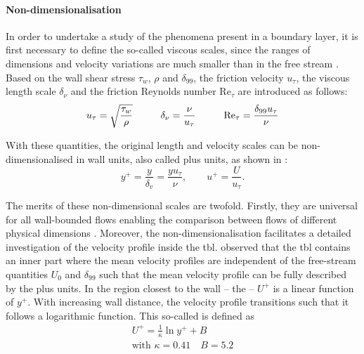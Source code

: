 \paragraph{Non-dimensionalisation}

In order to undertake a study of the phenomena present in a boundary layer, it is first necessary to define the so-called viscous scales, since the ranges of dimensions and velocity variations are much smaller than in the free stream \citep{pope_turbulent_2015}.
%
Based on the wall shear stress $\tau_w$, $\rho$ and $\delta_{99}$, the friction velocity $u_{\tau}$, the viscous length scale $\delta_{\nu}$ and the friction Reynolds number $\mathrm{Re}_{\tau}$ are introduced as follows:
\begin{gather}
    u_{\tau} = \sqrt{\frac{\tau_w}{\rho}} \hspace{1.0cm}
    \delta_{\nu} = \frac{\nu}{u_{\tau}} \hspace{1.0cm}
    \mathrm{Re}_{\tau} = \frac{\delta_{99} u_\tau}{\nu}
\end{gather}

With these quantities, the original length and velocity scales can be non-dimensionalised in wall units, also called plus units, as shown in \citep{moin_fundamentals_2024}:
\begin{equation}
    y^+ = \frac{y}{\delta_v} = \frac{y u_\tau}{\nu}, \qquad
    u^+ = \frac{U}{u_\tau}.
\end{equation}

The merits of these non-dimensional scales are twofold.  
Firstly, they are universal for all wall-bounded flows enabling the comparison between flows of different physical dimensions \citep{von_karman_mechanische_1930}.
Moreover, the non-dimensionalisation facilitates a detailed investigation of the velocity profile inside the \acrshort{tbl}.
\citet{prandtl_uber_1904} observed that the \acrshort{tbl} contains an inner part where the mean velocity profiles are independent of the free-stream quantities $U_0$ and $\delta_{99}$ such that the mean velocity profile can be fully described by the plus units.
In the region closest to the wall – the  – $U^+$ is a linear function of $y^+$. 
With increasing wall distance, the velocity profile transitions such that it follows a logarithmic function.
This so-called  is defined as 
\begin{gather}
    U^+ = \frac{1}{\kappa}\ln y^+ + B \\
    \text{with } \kappa = 0.41 \quad B = 5.2
\end{gather}

